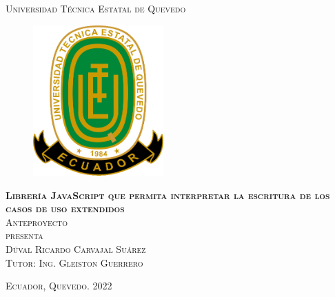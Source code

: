 \documentclass[12pt, openany, xcolor=table]{book}
\begin{document}
	
	\begin{titlepage}
		\begin{center}
			
			\textsc{\Large Universidad Técnica Estatal de Quevedo}\\[4em]
			
			\begin{figure}[h]
				\begin{center}
					\includegraphics[width=5cm]{images/logoUTEQ.png}
				\end{center}
			\end{figure}
			
			\vspace{4em}
			
			\textsc{\huge \textbf{Librería JavaScript que permita interpretar la escritura de los casos de uso extendidos}}\\[4em]
			
			\textsc{\large Anteproyecto}\\[1em]
			
			\textsc{presenta}\\[1em]
			
			\textsc{\Large Dúval Ricardo Carvajal Suárez}\\[1em]
			
			\textsc{\large Tutor: Ing. Gleiston Guerrero}
			
		\end{center}
		
		\vspace*{\fill}
		\textsc{Ecuador, Quevedo. \hspace*{\fill} 2022}
		
	\end{titlepage}
	
\end{document}
